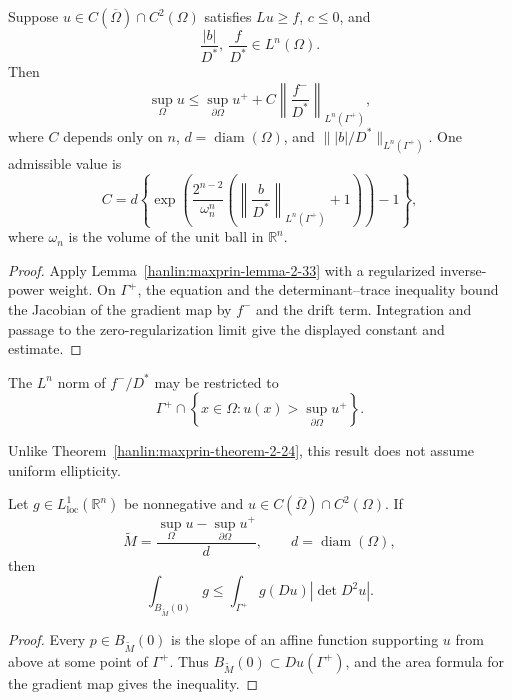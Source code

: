 \begin{theorem}\label{hanlin:maxprin-theorem-2-30}
Suppose $u\in C(\overline\Omega)\cap C^2(\Omega)$ satisfies $Lu\ge f$, $c\le0$,
and
\[
\frac{|b|}{D^*},\ \frac f{D^*}\in L^n(\Omega).
\]
Then
\[
\sup_\Omega u\le\sup_{\partial\Omega}u^+
+C\left\|\frac{f^-}{D^*}\right\|_{L^n(\Gamma^+)},
\]
where $C$ depends only on $n$, $d=\operatorname{diam}(\Omega)$, and
$\||b|/D^*\|_{L^n(\Gamma^+)}$. One admissible value is
\[
C=d\left\{\exp\!\left(
\frac{2^{n-2}}{\omega_n^n}
\left(\left\|\frac b{D^*}\right\|_{L^n(\Gamma^+)}+1\right)
\right)-1\right\},
\]
where $\omega_n$ is the volume of the unit ball in $\mathbb R^n$.
\end{theorem}
\begin{proof}
\sketch Apply Lemma~\ref{hanlin:maxprin-lemma-2-33} with a regularized
inverse-power weight. On $\Gamma^+$, the equation and the determinant--trace
inequality bound the Jacobian of the gradient map by $f^-$ and the drift term.
Integration and passage to the zero-regularization limit give the displayed
constant and estimate.
\end{proof}

\begin{remark}\label{hanlin:maxprin-remark-2-31}
The $L^n$ norm of $f^-/D^*$ may be restricted to
\[
\Gamma^+\cap\left\{x\in\Omega:
u(x)>\sup_{\partial\Omega}u^+\right\}.
\]
\end{remark}

\begin{remark}\label{hanlin:maxprin-remark-2-32}
Unlike Theorem~\ref{hanlin:maxprin-theorem-2-24}, this result does not assume
uniform ellipticity.
\end{remark}

\begin{lemma}\label{hanlin:maxprin-lemma-2-33}
Let $g\in L^1_{\mathrm{loc}}(\mathbb R^n)$ be nonnegative and
$u\in C(\overline\Omega)\cap C^2(\Omega)$. If
\[
\widetilde M=\frac{\sup_\Omega u-\sup_{\partial\Omega}u^+}
{d},
\qquad d=\operatorname{diam}(\Omega),
\]
then
\[
\int_{B_{\widetilde M}(0)}g
\le\int_{\Gamma^+}g(Du)|\det D^2u|.
\]
\end{lemma}
\begin{proof}
\sketch Every $p\in B_{\widetilde M}(0)$ is the slope of an affine function
supporting $u$ from above at some point of $\Gamma^+$. Thus
$B_{\widetilde M}(0)\subset Du(\Gamma^+)$, and the area formula for the gradient
map gives the inequality.
\end{proof}

